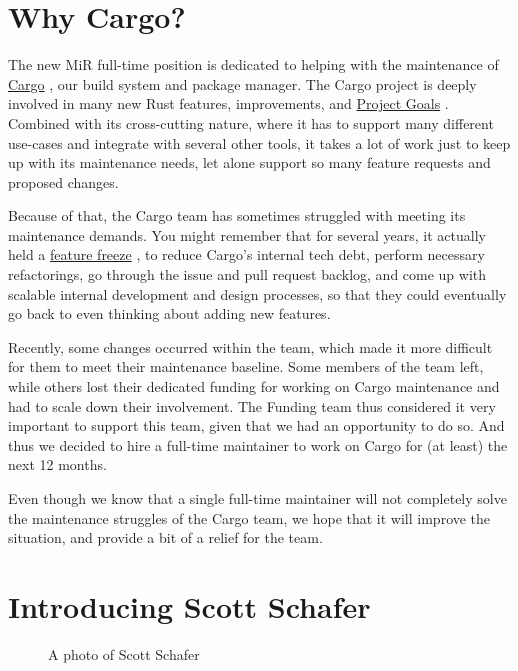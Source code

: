 \documentclass[11pt,a4paper]{article}
\begin{document}
\section{Why Cargo?}

The new MiR full-time position is dedicated to helping with the maintenance of \href{https://github.com/rust-lang/cargo}{Cargo} , our build system and package manager. The Cargo project is deeply involved in many new Rust features, improvements, and \href{https://goals.rust-lang.org/2026/goals.html\#cargo-team}{Project Goals} . Combined with its cross-cutting nature, where it has to support many different use-cases and integrate with several other tools, it takes a lot of work just to keep up with its maintenance needs, let alone support so many feature requests and proposed changes.

Because of that, the Cargo team has sometimes struggled with meeting its maintenance demands. You might remember that for several years, it actually held a \href{https://blog.rust-lang.org/inside-rust/2022/03/31/cargo-team-changes/}{feature freeze} , to reduce Cargo's internal tech debt, perform necessary refactorings, go through the issue and pull request backlog, and come up with scalable internal development and design processes, so that they could eventually go back to even thinking about adding new features.

Recently, some changes occurred within the team, which made it more difficult for them to meet their maintenance baseline. Some members of the team left, while others lost their dedicated funding for working on Cargo maintenance and had to scale down their involvement. The Funding team thus considered it very important to support this team, given that we had an opportunity to do so. And thus we decided to hire a full-time maintainer to work on Cargo for (at least) the next 12 months.

Even though we know that a single full-time maintainer will not completely solve the maintenance struggles of the Cargo team, we hope that it will improve the situation, and provide a bit of a relief for the team.

\section{Introducing Scott Schafer}

\begin{figure}[h]
\caption{A photo of Scott Schafer}
\end{figure}
\end{document}
